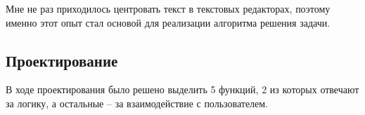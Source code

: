 \documentclass[12pt,a4paper]{report}
\begin{document}
\hspace{\parindent}
Мне не раз приходилось центровать текст в текстовых редакторах, поэтому именно этот опыт стал основой для реализации алгоритма решения задачи.
\subsection{Проектирование}
\hspace{\parindent}
В ходе проектирования было решено выделить 5 функций, 2 из которых отвечают за логику, а остальные -- за взаимодействие с пользователем.
\end{document}
